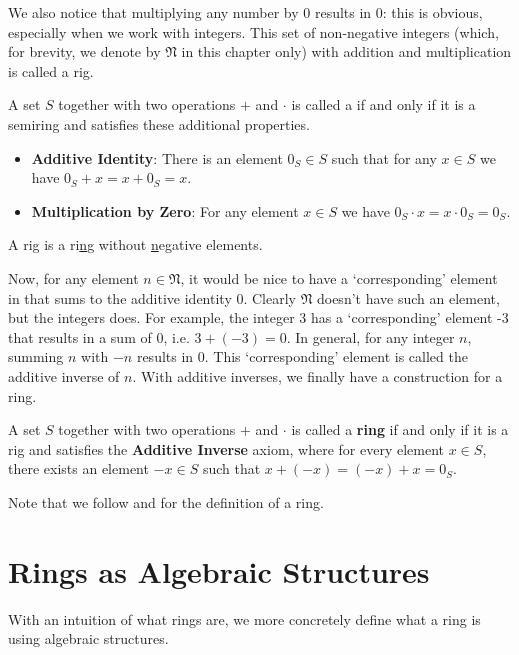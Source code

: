 We also notice that multiplying any number by 0 results in 0: this is obvious, especially when we work with integers. This set of non-negative integers (which, for brevity, we denote by $\mathfrak{N}$ in this chapter only) with addition and multiplication is called a rig.
\begin{definition}
    A set $S$ together with two operations $+$ and $\cdot$ is called a  if and only if it is a semiring and satisfies these additional properties.
    \begin{itemize}
        \item \textbf{Additive Identity}: There is an element $0_S \in S$ such that for any $x \in S$ we have $0_S + x = x + 0_S = x$.
        \item \textbf{Multiplication by Zero}: For any element $x \in S$ we have $0_S \cdot x = x \cdot 0_S = 0_S$.
    \end{itemize}
\end{definition}
\begin{remark}
    A rig is a ri\underline{n}g without \underline{n}egative elements.
\end{remark}

Now, for any element $n \in \mathfrak{N}$, it would be nice to have a `corresponding' element in that sums to the additive identity 0. Clearly $\mathfrak{N}$ doesn't have such an element, but the integers does. For example, the integer 3 has a `corresponding' element -3 that results in a sum of 0, i.e. $3 + (-3) = 0$. In general, for any integer $n$, summing $n$ with $-n$ results in 0. This `corresponding' element is called the additive inverse of $n$. With additive inverses, we finally have a construction for a ring.

\begin{definition}
    A set $S$ together with two operations $+$ and $\cdot$ is called a \textbf{ring} if and only if it is a rig and satisfies the \textbf{Additive Inverse} axiom, where for every element $x \in S$, there exists an element $-x \in S$ such that $x + (-x) = (-x) + x = 0_S$.
\end{definition}
\begin{remark}
    Note that we follow \cite[p.~223]{dummit_foote_2004} and \cite[p.~115, Definition 1.1]{hungerford_1980} for the definition of a ring.
\end{remark}

\section{Rings as Algebraic Structures}
With an intuition of what rings are, we more concretely define what a ring is using algebraic structures.

